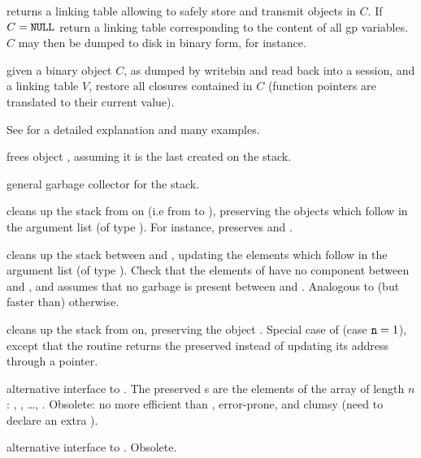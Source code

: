  returns a linking table allowing to safely
store and transmit  objects in $C$.  If $C = {\tt NULL}$ return a
linking table corresponding to the content of all gp variables. $C$ may then be
dumped to disk in binary form, for instance.

 given a binary object $C$, as dumped
by writebin and read back into a session, and a linking table $V$, restore all
closures contained in $C$ (function pointers are translated to their current
value).

See  for a detailed explanation and many examples.

 frees object , assuming it is the last created
on the stack.

 general garbage collector
for the stack.

 cleans up the stack from
 on (i.e from  to ), preserving the  objects
which follow in the argument list (of type ). For instance,
 preserves  and .

cleans up the stack between  and , updating
the  elements which follow  in the argument list (of type
). Check that the elements of  have no component between
 and , and assumes that no garbage is present between
 and . Analogous to (but faster than) 
otherwise.

 cleans up the stack  from
 on, preserving the object . Special case of 
(case ${\tt n} = 1$), except that the routine returns the preserved 
instead of updating its address through a pointer.

 alternative interface
to . The preserved s are the elements of the array
 of length $n$: , , \dots,
. Obsolete: no more efficient than ,
error-prone, and clumsy (need to declare an extra ).

alternative interface to . Obsolete.


